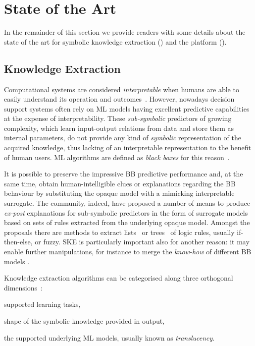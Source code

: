 \documentclass[
]{ceurart}
\begin{document}
\section{State of the Art}

In the remainder of this section we provide readers with some details about the state of the art for symbolic knowledge extraction () and the \psyke{} platform ().

\subsection{Knowledge Extraction}

Computational systems are considered \emph{interpretable} when humans are able to easily understand its operation and outcomes~\cite{agentbasedxai-aamas2020}.
%
However, nowadays decision support systems often rely on ML models having excellent predictive capabilities at the expense of interpretability.
%
These \emph{sub-symbolic} predictors of growing complexity, which learn input-output relations from data and store them as internal parameters, do not provide any kind of \emph{symbolic} representation of the acquired knowledge, thus lacking of an interpretable representation to the benefit of human users.
%
ML algorithms are defined as \emph{black boxes} for this reason~\cite{Lipton2018}.

It is possible to preserve the impressive BB predictive performance and, at the same time, obtain human-intelligible clues or explanations regarding the BB behaviour by substituting the opaque model with a mimicking interpretable surrogate.
%
The \xai{} community, indeed, have proposed a number of means to produce \emph{ex-post} explanations for sub-symbolic predictors in the form of surrogate models based on sets of rules extracted from the underlying opaque model.
%
Amongst the proposals there are methods to extract lists~\cite{craven1994using,huysmans2006iter,gridex-extraamas2021} or trees~\cite{craven1996extracting,breiman1984classification} of logic rules, usually if-then-else, \mofn{} or fuzzy.
%
SKE is particularly important also for another reason: it may enable further manipulations, for instance to merge the \emph{know-how} of different BB models \cite{xmas-aiiot2019}.

Knowledge extraction algorithms can be categorised along three orthogonal dimensions~\cite{xaisurvey-ia14}:
%
\begin{inlinelist}
    \item\label{item:category:learning-task} supported learning tasks,
    \item\label{item:category:knowledge-form} shape of the symbolic knowledge provided in output,
    \item\label{item:category:translucency} the supported underlying ML models, usually known as \emph{translucency}.
\end{inlinelist}
\end{document}
